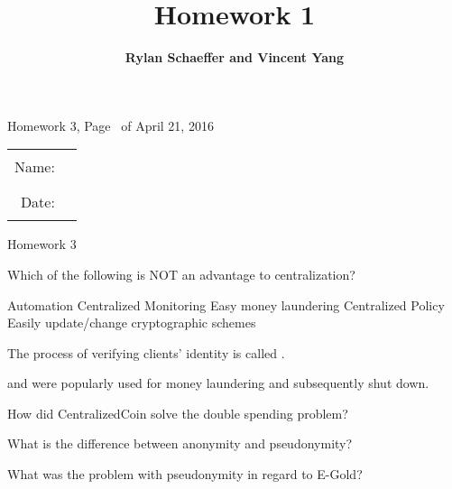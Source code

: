\documentclass{exam}
\title{\bf Homework 1}
\author{\bf Rylan Schaeffer and Vincent Yang}
\begin{document}
\pagestyle{headandfoot}
\runningheadrule
{}
              {Homework 3, Page \thepage\ of \numpages}
              {April 21, 2016}
\firstpagefooter{}{}{}
\runningfooter{}{}{}
\begin{tabular}{rl}
Name:  & \rule{0.25\linewidth}{\linethickness} \\ 
Date:  & \rule{0.25\linewidth}{\linethickness} \\ 
\end{tabular}
\vspace{5mm}

\begin{center} 
  \Large Homework 3
\end{center} 

\begin{center}
\end{center}

\addpoints
\begin{center}
\gradetable[h][questions]
\end{center}


\begin{questions}

  \question[3]
  Which of the following is NOT an advantage to centralization?
  \begin{choices}
    \choice Automation
    \choice Centralized Monitoring
    \choice Easy money laundering
    \choice Centralized Policy
    \choice Easily update/change cryptographic schemes
  \end{choices}

  \question[5] The process of verifying clients' identity is called . 

  \question[5]  and  were popularly used for money laundering and subsequently shut down.

  \question[25] How did CentralizedCoin solve the double spending problem?
  \fillwithlines{.8in}

  \question[10] What is the difference between anonymity and pseudonymity?
  \fillwithlines{.8in}

  \question[20] What was the problem with pseudonymity in regard to E-Gold?
  \fillwithlines{1.2in}
\end{questions}
\end{document}
